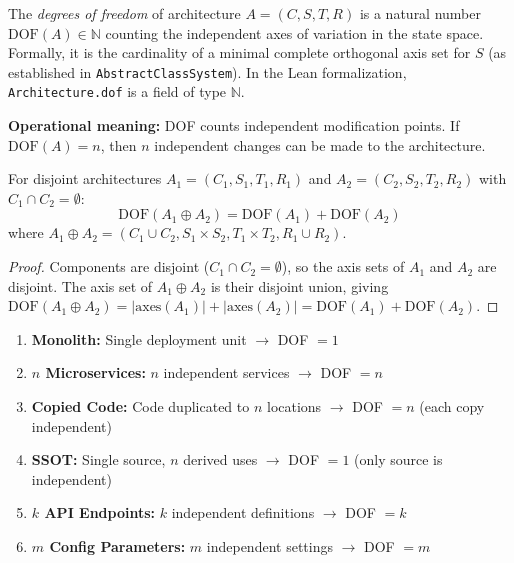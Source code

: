 \begin{definition}\label{def:dof}
The \emph{degrees of freedom} of architecture $A = (C, S, T, R)$ is a natural number $\text{DOF}(A) \in \mathbb{N}$ counting the independent axes of variation in the state space. Formally, it is the cardinality of a minimal complete orthogonal axis set for $S$ (as established in \texttt{AbstractClassSystem}). In the Lean formalization, \texttt{Architecture.dof} is a field of type $\mathbb{N}$.
\end{definition}

\textbf{Operational meaning:} DOF counts independent modification points. If $\text{DOF}(A) = n$, then $n$ independent changes can be made to the architecture.

\begin{proposition}\label{prop:dof-additive}
For disjoint architectures
$A_1 = (C_1, S_1, T_1, R_1)$ and
$A_2 = (C_2, S_2, T_2, R_2)$
with $C_1 \cap C_2 = \emptyset$:
\[
\text{DOF}(A_1 \oplus A_2) = \text{DOF}(A_1) + \text{DOF}(A_2)
\]
where $A_1 \oplus A_2 = (C_1 \cup C_2, S_1 \times S_2, T_1 \times T_2, R_1 \cup R_2)$.
\end{proposition}

\begin{proof}
Components are disjoint ($C_1 \cap C_2 = \emptyset$), so the axis sets of $A_1$ and $A_2$ are disjoint. The axis set of $A_1 \oplus A_2$ is their disjoint union, giving $\text{DOF}(A_1 \oplus A_2) = |\text{axes}(A_1)| + |\text{axes}(A_2)| = \text{DOF}(A_1) + \text{DOF}(A_2)$.
\end{proof}

\begin{example}
\begin{enumerate}
\item \textbf{Monolith:} Single deployment unit $\to$ DOF $= 1$
\item \textbf{$n$ Microservices:} $n$ independent services $\to$ DOF $= n$
\item \textbf{Copied Code:} Code duplicated to $n$ locations $\to$ DOF $= n$ (each copy independent)
\item \textbf{SSOT:} Single source, $n$ derived uses $\to$ DOF $= 1$ (only source is independent)
\item \textbf{$k$ API Endpoints:} $k$ independent definitions $\to$ DOF $= k$
\item \textbf{$m$ Config Parameters:} $m$ independent settings $\to$ DOF $= m$
\end{enumerate}
\end{example}

